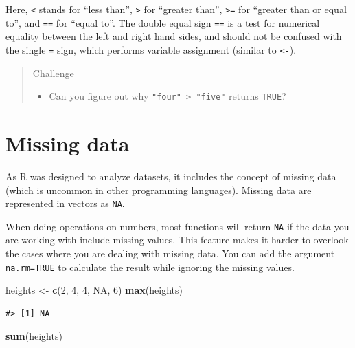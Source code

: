 \documentclass[]{book}
\newenvironment{Shaded}{\begin{snugshade}}{\end{snugshade}}
\newcommand{\KeywordTok}[1]{\textcolor[rgb]{0.13,0.29,0.53}{\textbf{#1}}}
\newcommand{\DecValTok}[1]{\textcolor[rgb]{0.00,0.00,0.81}{#1}}
\newcommand{\StringTok}[1]{\textcolor[rgb]{0.31,0.60,0.02}{#1}}
\newcommand{\OtherTok}[1]{\textcolor[rgb]{0.56,0.35,0.01}{#1}}
\newcommand{\NormalTok}[1]{#1}
\providecommand{\tightlist}{%
  \setlength{\itemsep}{0pt}\setlength{\parskip}{0pt}}
\begin{document}
Here, \texttt{\textless{}} stands for ``less than'',
\texttt{\textgreater{}} for ``greater than'', \texttt{\textgreater{}=}
for ``greater than or equal to'', and \texttt{==} for ``equal to''. The
double equal sign \texttt{==} is a test for numerical equality between
the left and right hand sides, and should not be confused with the
single \texttt{=} sign, which performs variable assignment (similar to
\texttt{\textless{}-}).

\begin{quote}
Challenge

\begin{itemize}
\tightlist
\item
  Can you figure out why \texttt{"four"\ \textgreater{}\ "five"} returns
  \texttt{TRUE}?
\end{itemize}
\end{quote}

\section{Missing data}\label{missing-data}

As R was designed to analyze datasets, it includes the concept of
missing data (which is uncommon in other programming languages). Missing
data are represented in vectors as \texttt{NA}.

When doing operations on numbers, most functions will return \texttt{NA}
if the data you are working with include missing values. This feature
makes it harder to overlook the cases where you are dealing with missing
data. You can add the argument \texttt{na.rm=TRUE} to calculate the
result while ignoring the missing values.

\begin{Shaded}
\begin{Highlighting}[]
\NormalTok{heights <-}\StringTok{ }\KeywordTok{c}\NormalTok{(}\DecValTok{2}\NormalTok{, }\DecValTok{4}\NormalTok{, }\DecValTok{4}\NormalTok{, }\OtherTok{NA}\NormalTok{, }\DecValTok{6}\NormalTok{)}
\KeywordTok{max}\NormalTok{(heights)}
\end{Highlighting}
\end{Shaded}

\begin{verbatim}
#> [1] NA
\end{verbatim}

\begin{Shaded}
\begin{Highlighting}[]
\KeywordTok{sum}\NormalTok{(heights)}
\end{Highlighting}
\end{Shaded}
\end{document}
